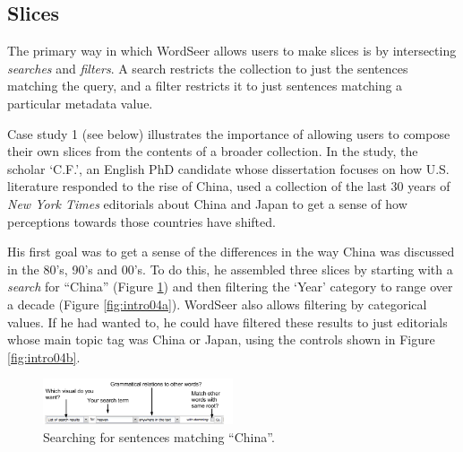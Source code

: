 \documentclass{sig-alternate}
\begin{document}
\subsection{Slices}

The primary way in which WordSeer allows users to make slices is by intersecting \emph{searches} and \emph{filters}.  A search restricts the collection to just the sentences matching the query, and a filter restricts it to just sentences matching a particular metadata value. 

Case study 1 (see below) illustrates the importance of allowing users to compose their own slices from the contents of a  broader collection. In the study, the scholar `C.F.', an English PhD candidate whose dissertation focuses on how U.S. literature responded to the rise of China, used a collection of  the last 30 years of \emph{New York Times} editorials about China and Japan to get a sense of how perceptions towards those countries have shifted.

His first goal was to get a sense of the differences in the way China was discussed in the 80's, 90's and 00's. To do this, he assembled three slices by starting with a \emph{search} for ``China'' (Figure \ref{fig:intro03})  and then filtering the `Year' category to range over a decade (Figure \ref{fig:intro04a}).  WordSeer also allows filtering by categorical values. If he had wanted to, he could have filtered these results to just editorials whose main topic tag was China or Japan, using the controls shown in Figure \ref{fig:intro04b}. 
\begin{figure}[ht!]
\begin{center}
	\includegraphics[width=0.5\textwidth]{fig/intro/03b.png}
\end{center}
    \caption{%
        Searching for sentences matching ``China''.\label{fig:intro03}
     }%
\end{figure}
\end{document}
